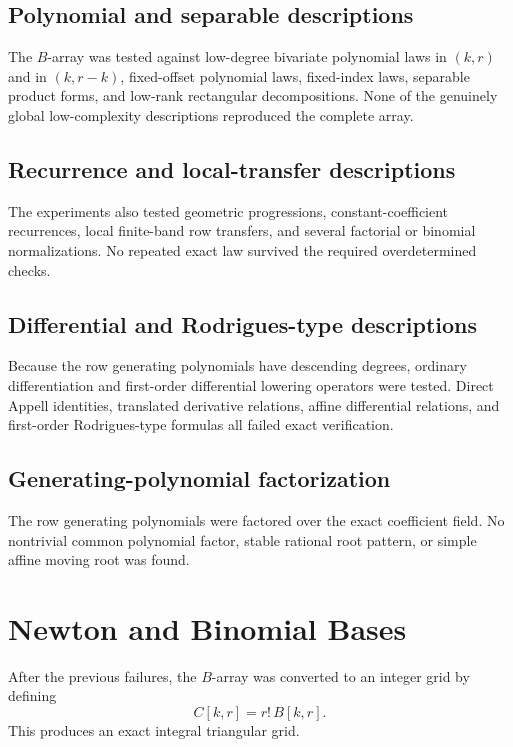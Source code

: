 \documentclass[11pt]{article}
\begin{document}
\subsection{Polynomial and separable descriptions}

The $B$-array was tested against low-degree bivariate polynomial laws in $(k,r)$ and in $(k,r-k)$, fixed-offset polynomial laws, fixed-index laws, separable product forms, and low-rank rectangular decompositions. None of the genuinely global low-complexity descriptions reproduced the complete array.

\subsection{Recurrence and local-transfer descriptions}

The experiments also tested geometric progressions, constant-coefficient recurrences, local finite-band row transfers, and several factorial or binomial normalizations. No repeated exact law survived the required overdetermined checks.

\subsection{Differential and Rodrigues-type descriptions}

Because the row generating polynomials have descending degrees, ordinary differentiation and first-order differential lowering operators were tested. Direct Appell identities, translated derivative relations, affine differential relations, and first-order Rodrigues-type formulas all failed exact verification.

\subsection{Generating-polynomial factorization}

The row generating polynomials were factored over the exact coefficient field. No nontrivial common polynomial factor, stable rational root pattern, or simple affine moving root was found.

\section{Newton and Binomial Bases}

After the previous failures, the $B$-array was converted to an integer grid by defining
\begin{equation}
    C[k,r]=r!\,B[k,r].
\end{equation}
This produces an exact integral triangular grid.
\end{document}

